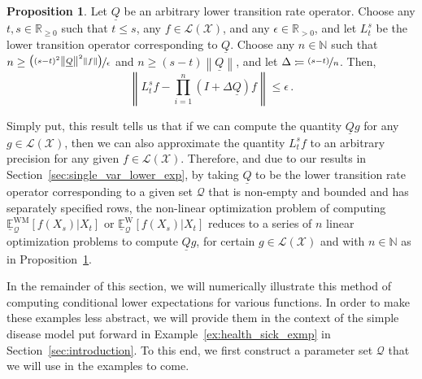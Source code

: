 \documentclass[10pt,a4paper]{paper}
\theoremstyle{definition}
\newtheorem{proposition}[theorem]{Proposition}
\newcommand{\nats}{\mathbb{N}}
\newcommand{\reals}{\mathbb{R}}
\newcommand{\realspos}{\reals_{>0}}
\newcommand{\realsnonneg}{\reals_{\geq 0}}
\newcommand{\states}{\mathcal{X}}
\newcommand{\gambles}{\mathcal{L}}
\newcommand{\gamblesX}{\gambles(\states)}
\newcommand{\rateset}{\mathcal{Q}}
\newcommand{\lrate}{\underline{Q}}
\newcommand{\norm}[1]{\left\lVert #1 \right\rVert}
\newcommand{\coloneqq}{:\!=}
\begin{document}
\begin{proposition}\label{prop:approximation_error_bound}
Let $\lrate$ be an arbitrary lower transition rate operator. Choose any $t,s\in\realsnonneg$ such that $t\leq s$, any $f\in\gamblesX$, and any $\epsilon\in\realspos$, and let $L_t^s$ be the lower transition operator corresponding to $\lrate$. Choose any $n\in\nats$ such that $n\geq\nicefrac{\left((s-t)^2\norm{\lrate}^2\norm{f}\right)}{\epsilon}$ and $n\geq(s-t)\norm{\lrate}$,
and let $\Delta\coloneqq \nicefrac{(s-t)}{n}$. Then,
\begin{equation*}
\norm{L_t^sf - \prod_{i=1}^n(I + \Delta\lrate)f} \leq \epsilon\,.
\end{equation*}
\end{proposition}

Simply put, this result tells us that if we can compute the quantity $\lrate g$ for any $g\in\gamblesX$, then we can also approximate the quantity $L_t^sf$ to an arbitrary precision for any given $f\in\gamblesX$. Therefore, and due to our results in Section~\ref{sec:single_var_lower_exp}, by taking $\lrate$ to be the lower transition rate operator corresponding to a given set $\rateset$ that is non-empty and bounded and has separately specified rows, the non-linear optimization problem of computing $\underline{\mathbb{E}}_\rateset^\mathrm{WM}[f(X_s)\vert X_t]$ or $\underline{\mathbb{E}}_\rateset^\mathrm{W}[f(X_s)\vert X_t]$ reduces to a series of $n$ linear optimization problems to compute $\lrate g$, for certain $g\in\gamblesX$ and with $n\in\nats$ as in Proposition~\ref{prop:approximation_error_bound}.

In the remainder of this section, we will numerically illustrate this method of computing conditional lower expectations for various functions. In order to make these examples less abstract, we will provide them in the context of the simple disease model put forward in Example~\ref{ex:health_sick_exmp} in Section~\ref{sec:introduction}. To this end, we first construct a parameter set $\rateset$ that we will use in the examples to come.

\end{document}
